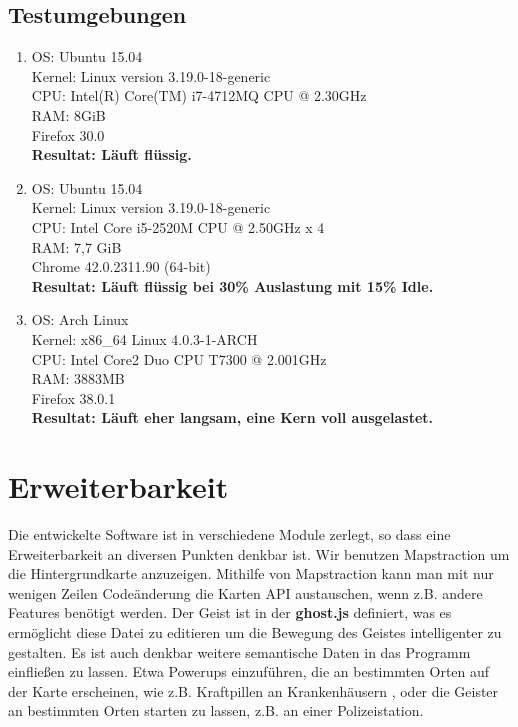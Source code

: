 \documentclass[11pt,a4paper]{article}
\begin{document}
\subsection{Testumgebungen}
\begin{enumerate}
\item OS: Ubuntu 15.04 \\
Kernel: Linux version 3.19.0-18-generic \\
CPU: Intel(R) Core(TM) i7-4712MQ CPU @ 2.30GHz \\
RAM: 8GiB \\
Firefox 30.0 \\
\textbf{Resultat: Läuft flüssig.}
\item OS: Ubuntu 15.04\\
Kernel: Linux version 3.19.0-18-generic \\ 
CPU: Intel Core i5-2520M CPU @ 2.50GHz x 4 \\
RAM: 7,7 GiB \\
Chrome 42.0.2311.90 (64-bit) \\
\textbf{Resultat: Läuft flüssig bei 30\% Auslastung mit 15\% Idle.}
\item OS: Arch Linux \\
Kernel: x86\_64 Linux 4.0.3-1-ARCH \\
CPU: Intel Core2 Duo CPU T7300 @ 2.001GHz \\
RAM: 3883MB \\
Firefox 38.0.1 \\
\textbf{Resultat: Läuft eher langsam, eine Kern voll ausgelastet.}
\end{enumerate}

\section{Erweiterbarkeit}
Die entwickelte Software ist in verschiedene Module zerlegt, so dass eine Erweiterbarkeit an diversen Punkten denkbar ist.
Wir benutzen Mapstraction um die Hintergrundkarte anzuzeigen.
Mithilfe von Mapstraction kann man mit nur wenigen Zeilen Codeänderung die Karten API austauschen, wenn z.B. andere Features benötigt werden.
Der Geist ist in der \textbf{ghost.js} definiert, was es ermöglicht diese Datei zu editieren um die Bewegung des Geistes intelligenter zu gestalten.
Es ist auch denkbar weitere semantische Daten in das Programm einfließen zu lassen. Etwa Powerups einzuführen, die an bestimmten Orten auf der Karte erscheinen, wie z.B. Kraftpillen an Krankenhäusern , oder die Geister an bestimmten Orten starten zu lassen, z.B. an einer Polizeistation.
\clearpage
\end{document}

